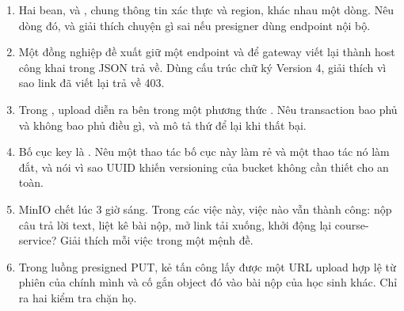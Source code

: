 \begin{quiz}
\begin{enumerate}
  \item Hai bean,  và , chung thông tin
  xác thực và region, khác nhau một dòng. Nêu dòng đó, và giải thích
  chuyện gì sai nếu presigner dùng endpoint nội bộ.
  \item Một đồng nghiệp đề xuất giữ một endpoint và để gateway viết lại
   thành host công khai trong JSON trả về. Dùng cấu
  trúc chữ ký Version 4, giải thích vì sao link đã viết lại trả về 403.
  \item Trong , upload diễn ra bên trong
  một phương thức . Nêu transaction bao phủ và
  không bao phủ điều gì, và mô tả thứ để lại khi  thất bại.
  \item Bố cục key là
  . Nêu
  một thao tác bố cục này làm rẻ và một thao tác nó làm đắt, và nói vì
  sao UUID khiến versioning của bucket không cần thiết cho an toàn.
  \item MinIO chết lúc 3 giờ sáng. Trong các việc này, việc nào vẫn
  thành công: nộp câu trả lời text, liệt kê bài nộp, mở link tải xuống,
  khởi động lại course-service? Giải thích mỗi việc trong một mệnh đề.
  \item Trong luồng presigned PUT, kẻ tấn công lấy được một URL upload
  hợp lệ từ phiên của chính mình và cố gắn object đó vào bài nộp của
  học sinh khác. Chỉ ra hai kiểm tra chặn họ.
\end{enumerate}
\end{quiz}
